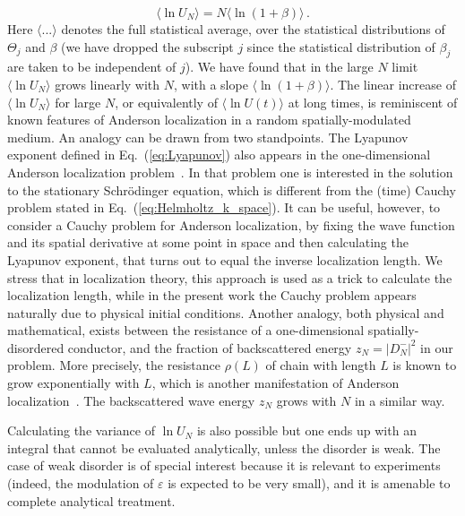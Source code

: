 \documentclass[ prl, twocolumn, superscriptaddress, amsfonts, amsmath,floatfix]{revtex4-1}
\begin{document}
\begin{equation}
\langle \ln U_N \rangle = N \langle \ln(1+\beta) \rangle \, .
\label{eq:energy_average1}
\end{equation}
Here $\langle ... \rangle$ denotes the full statistical average, over the statistical distributions of $\Theta_j$ and $\beta$ (we have dropped the subscript $j$ since the statistical distribution of $\beta_j$ are taken to be independent of $j$). We have found that in the large $N$ limit $\langle \ln U_N \rangle$ grows linearly with $N$, with a slope $\langle \ln (1+\beta) \rangle$. 
{The linear increase of $\langle \ln U_N \rangle$ for large $N$, or equivalently of $\langle \ln U(t) \rangle$ at long times, is reminiscent of known features of Anderson localization in a random spatially-modulated medium. An analogy can be drawn from two standpoints. The Lyapunov exponent defined in Eq.~(\ref{eq:Lyapunov}) also appears in the one-dimensional Anderson localization problem~\cite{Comtet2013}. In that problem one is interested in the solution to the stationary Schr\"odinger equation, which is different from the (time) Cauchy problem stated in Eq.~(\ref{eq:Helmholtz_k_space}). It can be useful, however, to consider a Cauchy problem for Anderson localization, by fixing the wave function and its spatial derivative at some point in space and then calculating the Lyapunov exponent, that turns out to equal the inverse localization length. We stress that in localization theory, this approach is used as a trick to calculate the localization length, while in the present work the Cauchy problem appears naturally due to physical initial conditions. 
Another analogy, both physical and mathematical, exists between the resistance of a one-dimensional spatially-disordered conductor, and the fraction of backscattered energy $z_N=|D_N^-|^2$ in our problem. More precisely, the resistance $\rho(L)$ of chain with length $L$ is known to grow exponentially with $L$, which is another manifestation of Anderson localization~\cite{Anderson1980}. The backscattered wave energy $z_N$ grows with $N$ in a similar way.}

Calculating the variance of $\ln U_N$ is also possible but one ends up with an integral that cannot be evaluated analytically, unless the disorder is weak. The case of weak disorder is of special interest because it is relevant to experiments (indeed, the modulation of $\varepsilon$ is expected to be very small), and it is amenable to complete analytical treatment.  
\end{document}
